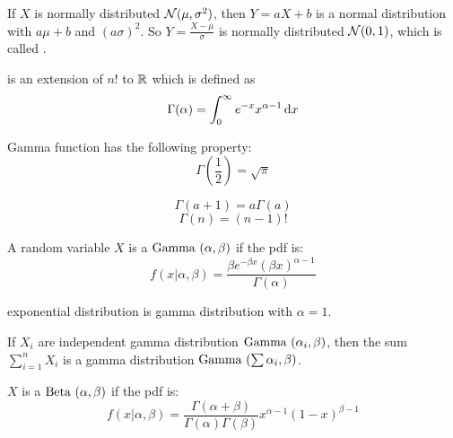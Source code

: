 \begin{theorem}
    If $X$ is normally distributed $\mathcal{N}(\mu,\sigma^2)$, then $Y = aX + b$ is a normal distribution with $a\mu + b$ and $(a\sigma)^2$. So $Y =\displaystyle \frac{X - \mu}{\sigma}$ is normally distributed $\mathcal{N}(0,1)$, which is called .
\end{theorem}



\begin{definition}
     is an extension of $n!$ to $\mathbb{R}$ which is defined as
    \begin{equation}
        \Gamma(\alpha) = \int_0^\infty e^{-x} x^{\alpha - 1} \dif{x}
    \end{equation}

    Gamma function has the following property:
    \begin{equation}
        \Gamma \left(\frac{1}{2} \right) = \sqrt{\pi}
    \end{equation}
    
    \begin{equation}
        \Gamma (a + 1) = a \Gamma(a)
    \end{equation}
    \begin{equation}
        \Gamma (n) = (n-1)!
    \end{equation}
\end{definition}


\begin{definition}
    A random variable $X$ is a  $\text{Gamma }(\alpha,\beta)$ if the pdf is:
    \begin{equation}
        f(x|\alpha, \beta) = \frac{\beta e^{-\beta x} (\beta x)^{\alpha - 1}}{\Gamma(\alpha)}
    \end{equation}
    
    exponential distribution is gamma distribution with $\alpha = 1$.
\end{definition}

\begin{theorem}
    If $X_i$ are independent gamma distribution $\text{Gamma }(\alpha_i,\beta)$, then the sum $\displaystyle \sum_{i=1}^n X_i$ is a gamma distribution $\text{Gamma }(\sum \alpha_i,\beta)$.
\end{theorem}



\begin{definition}
    $X$ is a  $\text{Beta }(\alpha,\beta)$ if the pdf is:
    \begin{equation}
        f(x|\alpha, \beta) = \frac{\Gamma(\alpha + \beta)}{\Gamma(\alpha) \Gamma(\beta)} x^{\alpha - 1} (1-x)^{\beta - 1}
    \end{equation}
\end{definition}



